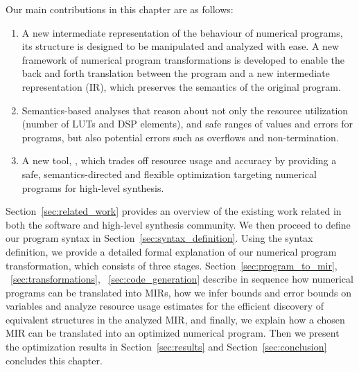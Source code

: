 Our main contributions in this chapter are as follows:
\begin{enumerate}
    \vspace{-6pt}
    \item
        A new intermediate representation of the behaviour of numerical
        programs, its structure is designed to be manipulated and analyzed
        with ease.  A new framework of numerical program transformations is
        developed to enable the back and forth translation between the program
        and a new intermediate representation (IR), which preserves the
        semantics of the original program.
    \vspace{-6pt}
    \item
        Semantics-based analyses that reason about not only the resource
        utilization (number of LUTs and DSP elements), and safe ranges of
        values and errors for programs, but also potential errors such as
        overflows and non-termination.
    \vspace{-6pt}
    \item
        A new tool, \newsoap, which trades off resource usage and accuracy
        by providing a safe, semantics-directed and flexible optimization
        targeting numerical programs for high-level synthesis.
    \vspace{-6pt}
\end{enumerate}

Section~\ref{sec:related_work} provides an overview of the existing work
related in both the software and high-level synthesis community.  We then
proceed to define our program syntax in Section~\ref{sec:syntax_definition}.
Using the syntax definition, we provide a detailed formal explanation
of our numerical program transformation, which consists of three
stages.  Section~\ref{sec:program_to_mir}, {}~\ref{sec:transformations},
{}~\ref{sec:code_generation} describe in sequence how numerical programs
can be translated into MIRs, how we infer bounds and error bounds on
variables and analyze resource usage estimates for the efficient discovery
of equivalent structures in the analyzed MIR, and finally, we explain how
a chosen MIR can be translated into an optimized numerical program.  Then
we present the optimization results in Section~\ref{sec:results} and
Section~\ref{sec:conclusion} concludes this chapter.
